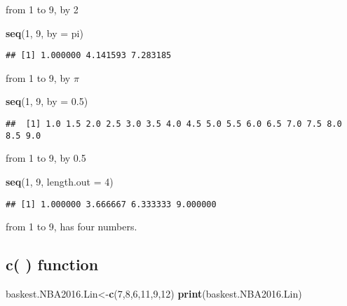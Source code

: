 \documentclass[]{article}
\newenvironment{Shaded}{\begin{snugshade}}{\end{snugshade}}
\newcommand{\DataTypeTok}[1]{\textcolor[rgb]{0.13,0.29,0.53}{#1}}
\newcommand{\DecValTok}[1]{\textcolor[rgb]{0.00,0.00,0.81}{#1}}
\newcommand{\FloatTok}[1]{\textcolor[rgb]{0.00,0.00,0.81}{#1}}
\newcommand{\KeywordTok}[1]{\textcolor[rgb]{0.13,0.29,0.53}{\textbf{#1}}}
\newcommand{\NormalTok}[1]{#1}
\begin{document}
from 1 to 9, by 2

\begin{Shaded}
\begin{Highlighting}[]
\KeywordTok{seq}\NormalTok{(}\DecValTok{1}\NormalTok{, }\DecValTok{9}\NormalTok{, }\DataTypeTok{by =}\NormalTok{ pi)}
\end{Highlighting}
\end{Shaded}

\begin{verbatim}
## [1] 1.000000 4.141593 7.283185
\end{verbatim}

from 1 to 9, by \(\pi\)

\begin{Shaded}
\begin{Highlighting}[]
\KeywordTok{seq}\NormalTok{(}\DecValTok{1}\NormalTok{, }\DecValTok{9}\NormalTok{, }\DataTypeTok{by =} \FloatTok{0.5}\NormalTok{)}
\end{Highlighting}
\end{Shaded}

\begin{verbatim}
##  [1] 1.0 1.5 2.0 2.5 3.0 3.5 4.0 4.5 5.0 5.5 6.0 6.5 7.0 7.5 8.0 8.5 9.0
\end{verbatim}

from 1 to 9, by 0.5

\begin{Shaded}
\begin{Highlighting}[]
\KeywordTok{seq}\NormalTok{(}\DecValTok{1}\NormalTok{, }\DecValTok{9}\NormalTok{, }\DataTypeTok{length.out =} \DecValTok{4}\NormalTok{)}
\end{Highlighting}
\end{Shaded}

\begin{verbatim}
## [1] 1.000000 3.666667 6.333333 9.000000
\end{verbatim}

from 1 to 9, has four numbers.

\hypertarget{c-function}{%
\subsection{c( ) function}\label{c-function}}

\begin{Shaded}
\begin{Highlighting}[]
\NormalTok{baskest.NBA2016.Lin<-}\KeywordTok{c}\NormalTok{(}\DecValTok{7}\NormalTok{,}\DecValTok{8}\NormalTok{,}\DecValTok{6}\NormalTok{,}\DecValTok{11}\NormalTok{,}\DecValTok{9}\NormalTok{,}\DecValTok{12}\NormalTok{)}
\KeywordTok{print}\NormalTok{(baskest.NBA2016.Lin)}
\end{Highlighting}
\end{Shaded}
\end{document}
